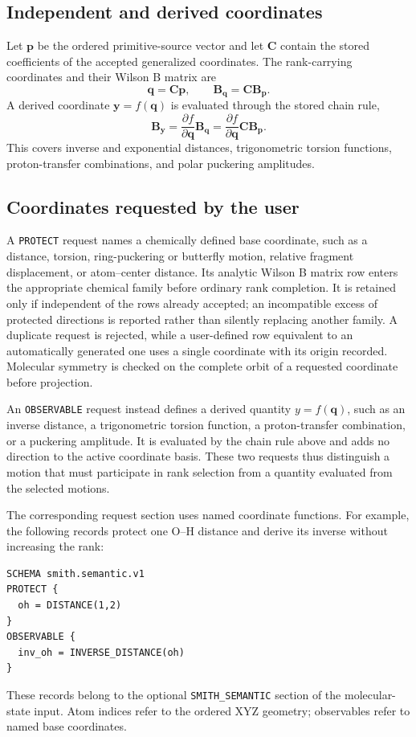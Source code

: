 \documentclass[10pt]{article}
\newcommand{\Bmat}{\mathbf{B}}
\newcommand{\q}{\mathbf{q}}
\begin{document}
\subsection{Independent and derived coordinates}

Let \(\mathbf p\) be the ordered primitive-source vector and let
\(\mathbf C\) contain the stored coefficients of the accepted generalized
coordinates.  The rank-carrying coordinates and their {Wilson B matrix} are
\begin{equation}
 \q=\mathbf C\mathbf p,
 \qquad
 \Bmat_{\q}=\mathbf C\Bmat_{\mathbf p}.
 \label{eq:si-stored-coordinate-definition}
\end{equation}
A derived coordinate \(\mathbf y=f(\q)\) is evaluated through the stored chain
rule,
\[
 \Bmat_{\mathbf y}
 =\frac{\partial f}{\partial\q}\Bmat_{\q}
 =\frac{\partial f}{\partial\q}\mathbf C\Bmat_{\mathbf p}.
\]
This covers inverse and exponential distances, trigonometric torsion
functions, proton-transfer combinations, and polar puckering amplitudes.

\subsection{{Coordinates requested by the user}}

{A \texttt{PROTECT} request names a chemically defined base
coordinate, such as a distance, torsion, ring-puckering or butterfly motion,
relative fragment displacement, or atom--center distance. Its analytic Wilson
B matrix row enters the appropriate chemical family before ordinary rank
completion. It is retained only if independent of the rows already accepted;
an incompatible excess of protected directions is reported rather than
silently replacing another family. A duplicate request is rejected, while a
user-defined row equivalent to an automatically generated one uses a single
coordinate with its origin recorded. Molecular symmetry is checked on the
complete orbit of a requested coordinate before projection.}

{An \texttt{OBSERVABLE} request instead defines a derived
quantity \(y=f(\q)\), such as an inverse distance, a trigonometric torsion
function, a proton-transfer combination, or a puckering amplitude. It is
evaluated by the chain rule above and adds no direction to the active
coordinate basis. These two requests thus distinguish a motion that must
participate in rank selection from a quantity evaluated from the selected
motions.}

{The corresponding request section uses named coordinate
functions. For example, the following records protect one O--H distance
and derive its inverse without increasing the rank:}
\begin{lstlisting}[basicstyle=\ttfamily\scriptsize]
SCHEMA smith.semantic.v1
PROTECT {
  oh = DISTANCE(1,2)
}
OBSERVABLE {
  inv_oh = INVERSE_DISTANCE(oh)
}
\end{lstlisting}
{These records belong to the optional
\texttt{SMITH\_SEMANTIC} section of the molecular-state input. Atom indices
refer to the ordered XYZ geometry; observables refer to named base
coordinates.}
\end{document}
